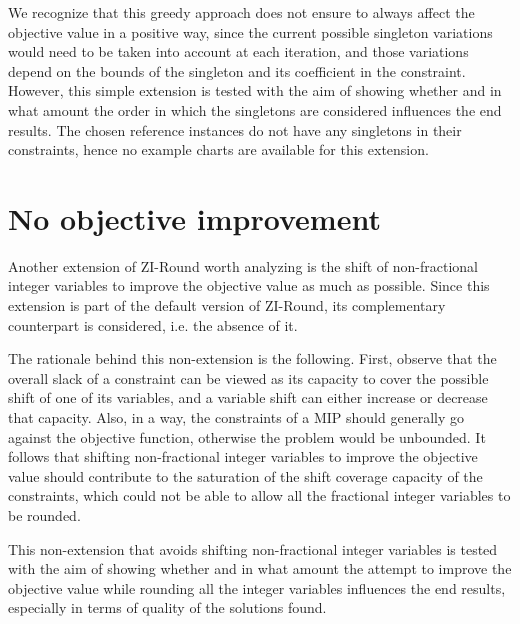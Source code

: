 \documentclass[a4paper,12pt]{book}
\begin{document}
We recognize that this greedy approach does not ensure to always affect the objective value in a positive way, since the current possible singleton variations would need to be taken into account at each iteration, and those variations depend on the bounds of the singleton and its coefficient in the constraint. However, this simple extension is tested with the aim of showing whether and in what amount the order in which the singletons are considered influences the end results. The chosen reference instances do not have any singletons in their constraints, hence no example charts are available for this extension.

\section{No objective improvement}
Another extension of ZI-Round worth analyzing is the shift of non-fractional integer variables to improve the objective value as much as possible. Since this extension is part of the default version of ZI-Round, its complementary counterpart is considered, i.e. the absence of it. \par

The rationale behind this non-extension is the following. First, observe that the overall slack of a constraint can be viewed as its capacity to cover the possible shift of one of its variables, and a variable shift can either increase or decrease that capacity. Also, in a way, the constraints of a MIP should generally go against the objective function, otherwise the problem would be unbounded. It follows that shifting non-fractional integer variables to improve the objective value should contribute to the saturation of the shift coverage capacity of the constraints, which could not be able to allow all the fractional integer variables to be rounded. \par

This non-extension that avoids shifting non-fractional integer variables is tested with the aim of showing whether and in what amount the attempt to improve the objective value while rounding all the integer variables influences the end results, especially in terms of quality of the solutions found. \par
\end{document}
